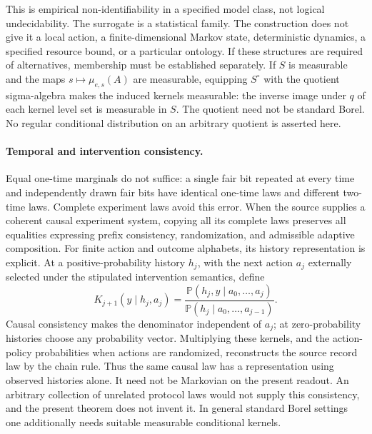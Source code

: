 \documentclass[11pt,a4paper]{article}
\theoremstyle{definition}
\theoremstyle{remark}\newtheorem{remark}[theorem]{Remark}
\newcommand{\Prb}{\mathbb P}
\begin{document}
This is empirical non-identifiability in a specified model class, not
logical undecidability. The surrogate is a statistical family. The
construction does not give it a local action, a finite-dimensional
Markov state, deterministic dynamics, a specified resource bound, or a
particular ontology. If these structures are required of alternatives,
membership must be established separately. If $S$ is measurable and the
maps $s\mapsto\mu_{e,s}(A)$ are measurable, equipping $S^\circ$ with the
quotient sigma-algebra makes the induced kernels measurable: the inverse
image under $q$ of each kernel level set is measurable in $S$. The
quotient need not be standard Borel. No regular conditional distribution
on an arbitrary quotient is asserted here.

\paragraph{Temporal and intervention consistency.}
Equal one-time marginals do not suffice: a single fair bit repeated at
every time and independently drawn fair bits have identical one-time
laws and different two-time laws. Complete experiment laws avoid this
error. When the source supplies a coherent causal experiment system,
copying all its complete laws preserves all equalities expressing prefix
consistency, randomization, and admissible adaptive composition. For
finite action and outcome alphabets, its history representation is
explicit. At a positive-probability history $h_j$, with the next action
$a_j$ externally selected under the stipulated intervention semantics,
define
\[
 K_{j+1}(y\mid h_j,a_j)
 =\frac{\Prb(h_j,y\mid a_0,\ldots,a_j)}
 {\Prb(h_j\mid a_0,\ldots,a_{j-1})}.
\]
Causal consistency makes the denominator independent of $a_j$; at
zero-probability histories choose any probability vector. Multiplying
these kernels, and the action-policy probabilities when actions are
randomized, reconstructs the source record law by the chain rule. Thus
the same causal law has a representation using observed histories alone.
It need not be Markovian on the present readout. An arbitrary collection
of unrelated protocol laws would not supply this consistency, and the
present theorem does not invent it. In general standard Borel settings
one additionally needs suitable measurable conditional kernels.
\end{document}
